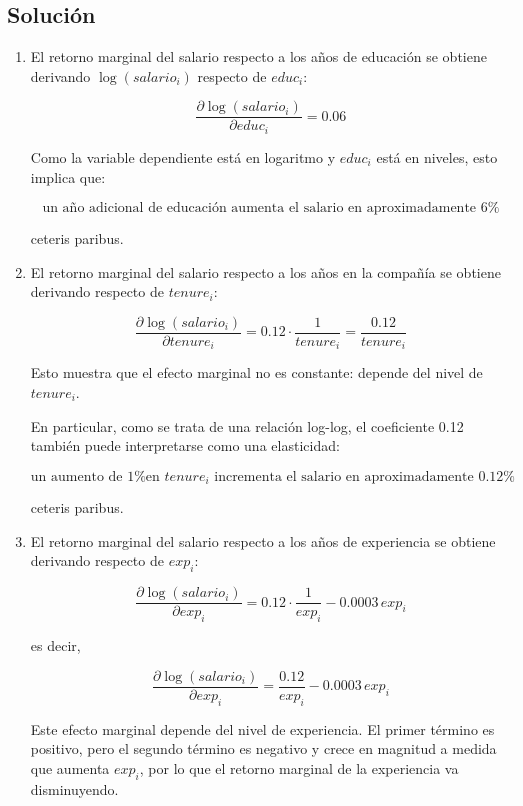 \documentclass[10pt,a4paper]{article}
\begin{document}
\begin{enumerate}
\subsection*{Solución}

\begin{enumerate}
    \item[a)] El retorno marginal del salario respecto a los años de educación se obtiene derivando $\log(salario_i)$ respecto de $educ_i$:

    \[
    \frac{\partial \log(salario_i)}{\partial educ_i} = 0.06
    \]

    Como la variable dependiente está en logaritmo y $educ_i$ está en niveles, esto implica que:

    \[
    \text{un año adicional de educación aumenta el salario en aproximadamente } 6\%
    \]

    ceteris paribus.

    \item[b)] El retorno marginal del salario respecto a los años en la compañía se obtiene derivando respecto de $tenure_i$:

    \[
    \frac{\partial \log(salario_i)}{\partial tenure_i}
    = 0.12 \cdot \frac{1}{tenure_i}
    = \frac{0.12}{tenure_i}
    \]

    Esto muestra que el efecto marginal no es constante: depende del nivel de $tenure_i$.

    En particular, como se trata de una relación log-log, el coeficiente 0.12 también puede interpretarse como una elasticidad:

    \[
    \text{un aumento de 1\% en } tenure_i \text{ incrementa el salario en aproximadamente } 0.12\%
    \]

    ceteris paribus.

    \item[c)] El retorno marginal del salario respecto a los años de experiencia se obtiene derivando respecto de $exp_i$:

    \[
    \frac{\partial \log(salario_i)}{\partial exp_i}
    = 0.12 \cdot \frac{1}{exp_i} - 0.0003\,exp_i
    \]

    es decir,

    \[
    \frac{\partial \log(salario_i)}{\partial exp_i}
    = \frac{0.12}{exp_i} - 0.0003\,exp_i
    \]

    Este efecto marginal depende del nivel de experiencia. El primer término es positivo, pero el segundo término es negativo y crece en magnitud a medida que aumenta $exp_i$, por lo que el retorno marginal de la experiencia va disminuyendo.


\end{enumerate}
\end{enumerate}
\end{document}
